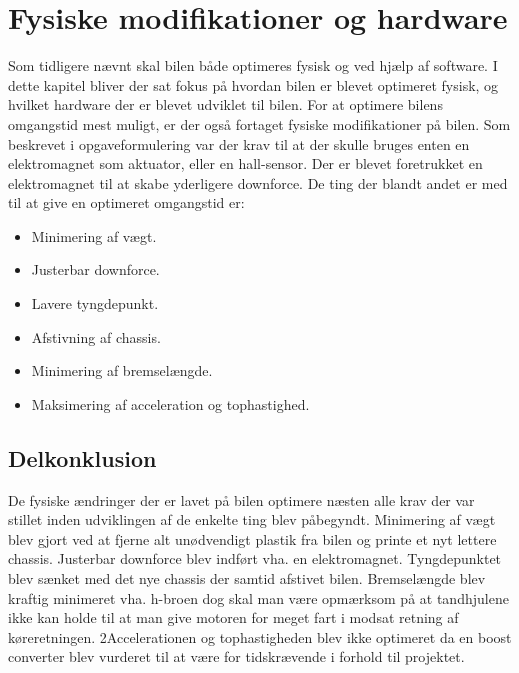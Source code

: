 
\section{Fysiske modifikationer og hardware}
Som tidligere nævnt skal bilen både optimeres fysisk og ved hjælp af software.
I dette kapitel bliver der sat fokus på hvordan bilen er blevet optimeret fysisk, og hvilket hardware der er blevet udviklet til bilen.
For at optimere bilens omgangstid mest muligt, er der også fortaget fysiske modifikationer på bilen.
Som beskrevet i opgaveformulering var der krav til at der skulle bruges enten en elektromagnet som aktuator, eller en hall-sensor.
Der er blevet foretrukket en elektromagnet til at skabe yderligere downforce.
De ting der blandt andet er med til at give en optimeret omgangstid er:
\begin{itemize}
\item Minimering af vægt.
\item Justerbar downforce.
\item Lavere tyngdepunkt.
\item Afstivning af chassis.
\item Minimering af bremselængde.
\item Maksimering af acceleration og tophastighed.
\end{itemize}










\subsection{Delkonklusion}
De fysiske ændringer der er lavet på bilen optimere næsten alle krav der var stillet inden udviklingen af de enkelte ting blev påbegyndt.
Minimering af vægt blev gjort ved at fjerne alt unødvendigt plastik fra bilen og printe et nyt lettere chassis.
Justerbar downforce blev indført vha. en elektromagnet. Tyngdepunktet blev sænket med det nye chassis der samtid afstivet bilen.
Bremselængde blev kraftig minimeret vha. h-broen dog skal man være opmærksom på at tandhjulene ikke kan holde til at man give motoren for meget fart i modsat retning af køreretningen.
2Accelerationen og tophastigheden blev ikke optimeret da en boost converter blev vurderet til at være for tidskrævende i forhold til projektet.
